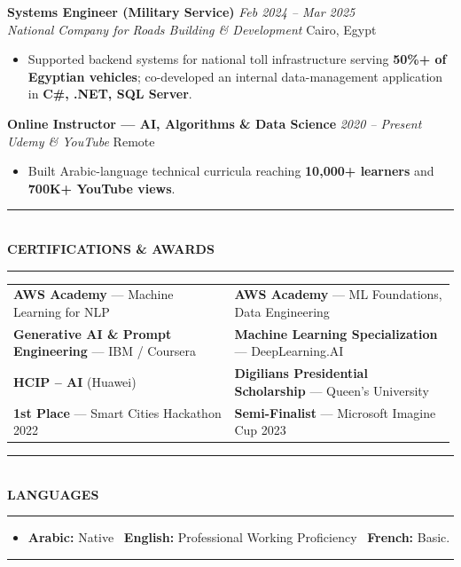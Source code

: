 \documentclass[10pt, a4paper]{article}
\makeatletter
\newcommand{\cvsection}[1]{%
  \vspace{3pt}%
  {\color{navy}\rule{\linewidth}{1.1pt}}\\[0.5pt]%
  {\color{navy}\bfseries\fontsize{9.5}{11}\selectfont\uppercase{#1}}\\[-4pt]%
  {\color{teal}\rule{\linewidth}{0.6pt}}%
  \vspace{2pt}%
}
\newcommand{\cventry}[4]{%
  \vspace{2.5pt}%
  \textbf{\color{darkgray}#1} \hfill {\color{midgray}\textit{#3}}\\[-1.5pt]%
  {\color{teal}\textit{#2}} \hfill {\color{midgray}#4}%
}
\newenvironment{cvitems}{%
  \begin{itemize}[leftmargin=11pt, itemsep=0.5pt, parsep=0pt, topsep=1pt,
                  label={\textcolor{teal}{$\bullet$}}]
}{%
  \end{itemize}%
}
\newenvironment{dualcol}{%
  \begin{tabular*}{\linewidth}{@{}p{0.495\linewidth}@{\hspace{0.01\linewidth}}p{0.495\linewidth}@{}}
}{%
  \end{tabular*}%
}
\makeatother
\begin{document}
\cventry{Systems Engineer (Military Service)}{National Company for Roads Building \& Development}
        {Feb 2024 -- Mar 2025}{Cairo, Egypt}
\begin{cvitems}
  \item Supported backend systems for national toll infrastructure serving \textbf{50\%+ of Egyptian vehicles}; co-developed an internal data-management application in \textbf{C\#, .NET, SQL Server}.
\end{cvitems}

\cventry{Online Instructor --- AI, Algorithms \& Data Science}{Udemy \& YouTube}
        {2020 -- Present}{Remote}
\begin{cvitems}
  \item Built Arabic-language technical curricula reaching \textbf{10,000+ learners} and \textbf{700K+ YouTube views}.
\end{cvitems}

\cvsection{Certifications \& Awards}

\begin{dualcol}
  \textbf{AWS Academy} --- Machine Learning for NLP &
  \textbf{AWS Academy} --- ML Foundations, Data Engineering \\[2pt]
  \textbf{Generative AI \& Prompt Engineering} --- IBM / Coursera &
  \textbf{Machine Learning Specialization} --- DeepLearning.AI \\[2pt]
  \textbf{HCIP -- AI} (Huawei) &
  \textbf{Digilians Presidential Scholarship} --- Queen's University \\[2pt]
  \textbf{1st Place} --- Smart Cities Hackathon 2022 &
  \textbf{Semi-Finalist} --- Microsoft Imagine Cup 2023 \\
\end{dualcol}

\cvsection{Languages}

\begin{cvitems}
  \item \textbf{Arabic:} Native \textperiodcentered\ \textbf{English:} Professional Working Proficiency \textperiodcentered\ \textbf{French:} Basic.
\end{cvitems}

\vspace{3pt}
{\color{navy}\rule{\linewidth}{0.8pt}}
\end{document}
